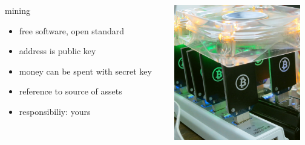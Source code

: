 \documentclass[12pt,english]{beamer}
\begin{document}
\begin{frame}
	\frametitle{}
  \begin{columns}[T]
    \begin{column}{.4\textwidth}
	\begin{block}{mining}
	\begin{itemize}
		\item free software, open standard
		\item address is public key
		\item money can be spent with secret key
		\item reference to source of assets
		\item responsibiliy: yours
	\end{itemize}
	\end{block}
    \end{column}
    \begin{column}{.5\textwidth}
		\includegraphics[width=5.5cm]{./img/btc_presentation/miner.jpg}
    \end{column}
  \end{columns}
\end{frame}



\end{document}
